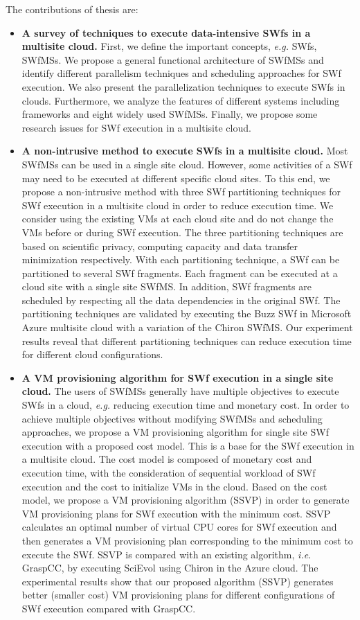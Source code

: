 The contributions of thesis are:

\begin{itemize}
\item \textbf{A survey of techniques to execute data-intensive SWfs in a multisite cloud.} First, we define the important concepts, \textit{e.g.} SWfs, SWfMSs. We propose a general functional architecture of SWfMSs and identify different parallelism techniques and scheduling approaches for SWf execution. We also present the parallelization techniques to execute SWfs in clouds. Furthermore, we analyze the features of different systems including frameworks and eight widely used SWfMSs. Finally, we propose some research issues for SWf execution in a multisite cloud.

\item \textbf{A non-intrusive method to execute SWfs in a multisite cloud.} Most SWfMSs can be used in a single site cloud. However, some activities of a SWf may need to be executed at different specific cloud sites. To this end, we propose a non-intrusive method with three SWf partitioning techniques for SWf execution in a multisite cloud in order to reduce execution time. We consider using the existing VMs at each cloud site and do not change the VMs before or during SWf execution. The three partitioning techniques are based on scientific privacy, computing capacity and data transfer minimization respectively.
With each partitioning technique, a SWf can be partitioned to several SWf fragments. Each fragment can be executed at a cloud site with a single site SWfMS.
In addition, SWf fragments are scheduled by respecting all the data dependencies in the original SWf. 
The partitioning techniques are validated by executing the Buzz SWf in Microsoft Azure multisite cloud with a variation of the Chiron SWfMS.
Our experiment results reveal that different partitioning techniques can reduce execution time for different cloud configurations.

\item \textbf{A VM provisioning algorithm for SWf execution in a single site cloud.} 
The users of SWfMSs generally have multiple objectives to execute SWfs in a cloud, \textit{e.g.} reducing execution time and monetary cost. In order to achieve multiple objectives without modifying SWfMSs and scheduling approaches, we propose a VM provisioning algorithm for single site SWf execution with a proposed cost model. This is a base for the SWf execution in a multisite cloud. The cost model is composed of monetary cost and execution time, with the consideration of sequential workload of SWf execution and the cost to initialize VMs in the cloud.
Based on the cost model, we propose a VM provisioning algorithm (SSVP) in order to generate VM provisioning plans for SWf execution with the minimum cost. SSVP calculates an optimal number of virtual CPU cores for SWf execution and then generates a VM provisioning plan corresponding to the minimum cost to execute the SWf.
SSVP is compared with an existing algorithm, \textit{i.e.} GraspCC, by executing SciEvol using Chiron in the Azure cloud. 
The experimental results show that our proposed algorithm (SSVP) generates better (smaller cost) VM provisioning plans for different configurations of SWf execution compared with GraspCC. 


\end{itemize}
